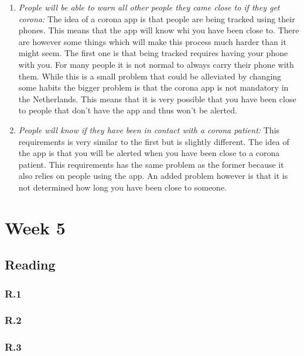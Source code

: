 \documentclass[]{article}
\begin{document}
\begin{enumerate}
    \item \textit{People will be able to warn all other people they came close to
    if they get corona: } The idea of a corona app is that people are being tracked 
    using their phones. This means that the app will know whi you have been close 
    to. There are however some things which will make this process much harder than 
    it might seem. The first one is that being tracked requires having your phone with you. 
    For many people it is not normal to always carry their phone with them. 
    While this is a small problem that could be alleviated by changing some habits
    the bigger problem is that the corona app is not mandatory in the Netherlands.
    This means that it is very possible that you have been close to people that 
    don't have the app and thus won't be alerted.

    \item \textit{People will know if they have been in contact with a corona patient:}
    This requirements is very similar to the first but is slightly different. 
    The idea of the app is that you will be alerted when you have been close to 
    a corona patient. This requirements has the same problem as the former 
    because it also relies on people using the app. An added problem however is 
    that it is not determined how long you have been close to someone. 

\end{enumerate}

\section*{Week 5}

\subsection*{Reading} 

\subsubsection*{R.1} 

\subsubsection*{R.2} 

\subsubsection*{R.3} 
\end{document}
